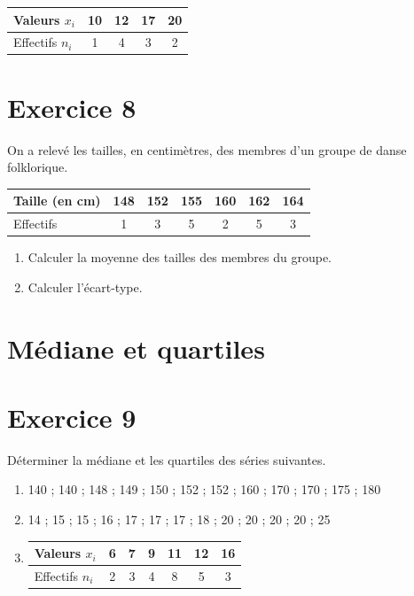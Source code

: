 \documentclass[french]{article}
\begin{document}
\begin{tabular}{| l | c | c | c | c |}
     \hline
     Valeurs $x_i$ & 10 & 12 & 17 & 20 \\ \hline
     Effectifs $n_i$ & 1 & 4 & 3 & 2  \\ 
     \hline
   \end{tabular}
\section*{Exercice 8}
On a relevé les tailles, en centimètres, des membres d'un groupe de danse folklorique.
   
   \begin{tabular}{| l | c | c | c | c | c | c |}
     \hline
     Taille (en cm) & 148 & 152 & 155 & 160 & 162 & 164 \\ \hline
     Effectifs & 1 & 3 & 5 & 2 & 5 & 3  \\ 
     \hline
   \end{tabular}
   
   \begin{enumerate}
   \item Calculer la moyenne des tailles des membres du groupe.
   \item Calculer l'écart-type.
   \end{enumerate}
   
   \section{Médiane et quartiles}
   \section*{Exercice 9}
   Déterminer la médiane et les quartiles des séries suivantes.
   \begin{enumerate}
   \item 140 ; 140 ; 148 ; 149 ; 150 ; 152 ; 152 ; 160 ; 170 ; 170 ; 175 ; 180
   \item 14 ; 15 ; 15 ; 16 ; 17 ; 17 ; 17 ; 18 ; 20 ; 20 ; 20 ; 20 ; 25
   \item \begin{tabular}{| l | c | c | c | c | c | c |}
     \hline
     Valeurs $x_i$ & 6 & 7 & 9 & 11 & 12 & 16 \\ \hline
     Effectifs $n_i$ & 2 & 3 & 4 & 8 & 5 & 3  \\ 
     \hline
   \end{tabular}
   \end{enumerate}
   
\end{document}
